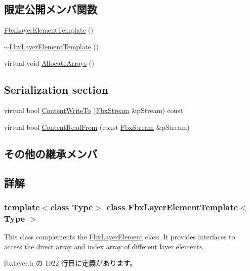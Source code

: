 \subsection*{限定公開メンバ関数}
\begin{DoxyCompactItemize}
\item 
\hyperlink{class_fbx_layer_element_template_a6a71830fc5470ac678678306dea4b550}{Fbx\+Layer\+Element\+Template} ()
\item 
\hyperlink{class_fbx_layer_element_template_a3d88304159752296aece120bb005e546}{$\sim$\+Fbx\+Layer\+Element\+Template} ()
\item 
virtual void \hyperlink{class_fbx_layer_element_template_aa6d432c5865fcda1b58376119f1fcaa8}{Allocate\+Arrays} ()
\end{DoxyCompactItemize}
\subsection*{Serialization section}
\begin{DoxyCompactItemize}
\item 
virtual bool \hyperlink{class_fbx_layer_element_template_a035bb7adbe8edf5a861d6154c7ebeb8b}{Content\+Write\+To} (\hyperlink{class_fbx_stream}{Fbx\+Stream} \&p\+Stream) const
\item 
virtual bool \hyperlink{class_fbx_layer_element_template_a19424f43272601bf018b8a0ba843b094}{Content\+Read\+From} (const \hyperlink{class_fbx_stream}{Fbx\+Stream} \&p\+Stream)
\end{DoxyCompactItemize}
\subsection*{その他の継承メンバ}


\subsection{詳解}
\subsubsection*{template$<$class Type$>$\newline
class Fbx\+Layer\+Element\+Template$<$ Type $>$}

This class complements the \hyperlink{class_fbx_layer_element}{Fbx\+Layer\+Element} class. It provides interfaces to access the direct array and index array of different layer elements. 

 fbxlayer.\+h の 1022 行目に定義があります。



